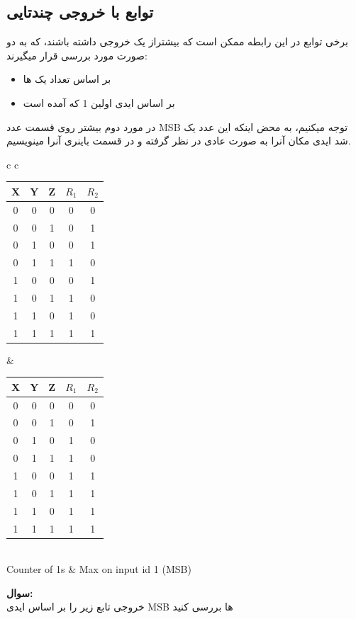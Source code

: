 \documentclass[20pt, a5paper]{article}
\begin{document}
\subsection{توابع با خروجی چندتایی}
برخی توابع در این رابطه ممکن است که بیشتراز
یک خروجی داشته باشند، که به دو صورت مورد بررسی قرار میگیرند:
\begin{itemize}
	\item بر اساس تعداد یک ها 
	\item بر اساس ایدی اولین 1 که آمده است
\end{itemize}
در مورد دوم بیشتر روی قسمت عدد MSB 
توجه میکنیم، به محض اینکه این عدد یک شد ایدی مکان آنرا به صورت عادی در نظر گرفته و در قسمت باینری آنرا مینویسیم.


\begin{LTR}
	\begin{tabular}{ c c }
		\begin{tabular}{ c c c | c | c}
			X & Y & Z & $R_{1}$ & $R_{2}$ \\
			\hline
			0 & 0 & 0 & 0 & 0\\
			0 & 0 & 1 & 0 & 1\\
			0 & 1 & 0 & 0 & 1\\
			0 & 1 & 1 & 1 & 0\\
			1 & 0 & 0 & 0 & 1\\
			1 & 0 & 1 & 1 & 0\\
			1 & 1 & 0 & 1 & 0\\
			1 & 1 & 1 & 1 & 1
		\end{tabular}& 
		\begin{tabular}{ c c c | c | c}
			X & Y & Z & $R_{1}$ & $R_{2}$ \\
			\hline
			0 & 0 & 0 & 0 & 0\\
			0 & 0 & 1 & 0 & 1\\
			0 & 1 & 0 & 1 & 0\\
			0 & 1 & 1 & 1 & 0\\
			1 & 0 & 0 & 1 & 1\\
			1 & 0 & 1 & 1 & 1\\
			1 & 1 & 0 & 1 & 1\\
			1 & 1 & 1 & 1 & 1
		\end{tabular}\\
		\hline
		Counter of 1s  & Max on input id 1 (MSB)
	\end{tabular}
\end{LTR}

\textbf{سوال:}\\
خروجی تابع زیر را بر اساس ایدی
MSB 
ها بررسی کنید
\end{document}
